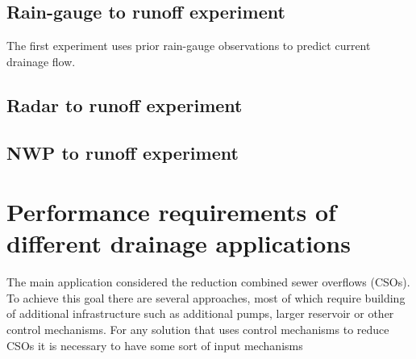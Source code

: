 \subsection{Rain-gauge to runoff experiment}
The first experiment uses prior rain-gauge observations to predict current drainage flow.
\subsection{Radar to runoff experiment}
\subsection{NWP to runoff experiment}



\section{Performance requirements of different drainage applications}
The main application considered the reduction combined sewer overflows (CSOs). To achieve this goal there are several approaches, most of which require building of additional infrastructure such as additional pumps, larger reservoir or other control mechanisms. For any solution that uses control mechanisms to reduce CSOs it is necessary to have some sort of input mechanisms 




\cite{ThorndahlRadar}